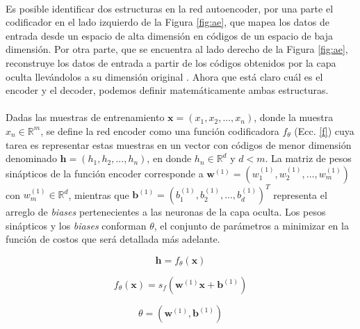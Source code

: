 \documentclass[12pt]{article}
\begin{document}
\paragraph{}
Es posible identificar dos estructuras en la red autoencoder, por una parte el codificador en el lado izquierdo de la Figura \ref{fig:ae}, que mapea los datos de entrada desde un espacio de alta dimensión en códigos de un espacio de baja dimensión. Por otra parte, que se encuentra al lado derecho de la Figura \ref{fig:ae}, reconstruye los datos de entrada a partir de los códigos obtenidos por la capa oculta llevándolos a su dimensión original \cite{shao}. Ahora que está claro cuál es el encoder y el decoder, podemos definir matemáticamente ambas estructuras.

\paragraph{}
Dadas las muestras de entrenamiento $\textbf{x}=(x_{1},x_{2},...,x_{n})$, donde la muestra $x_{n}\in \mathbb{R}^{m}$, se define la red encoder como una función codificadora $f_{\theta}$ (Ecc. \ref{f}) cuya tarea es representar estas muestras en un vector con códigos de menor dimensión denominado $\textbf{h}=(h_{1},h_{2},...,h_{n})$, en donde $h_{n} \in \mathbb{R}^{d}$ y $d<m$. La matriz de pesos sinápticos de la función encoder corresponde a $\textbf{w}^{(1)} = (w_{1}^{(1)},w_{2}^{(1)},...,w_{m}^{(1)})$ con $w_{m}^{(1)}\in \mathbb{R}^{d}$, mientras que $\textbf{b}^{(1)}=(b_{1}^{(1)},b_{2}^{(1)},...,b_{d}^{(1)})^T$ representa el arreglo de \textit{biases} pertenecientes a las neuronas de la capa oculta. Los pesos sinápticos y los \textit{biases} conforman $\theta$, el conjunto de parámetros a minimizar en la función de costos que será detallada más adelante.

\begin{equation}
\label{h}
\textbf{h}=f_{\theta}(\textbf{x})
\end{equation}

\begin{equation}
\label{f}
f_{\theta}(\textbf{x})=s_{f}(\textbf{w}^{(1)}\textbf{x}+\textbf{b}^{(1)})
\end{equation}

\begin{equation}
\label{teta1}
\theta=(\textbf{w}^{(1)},\textbf{b}^{(1)})
\end{equation}
\end{document}
